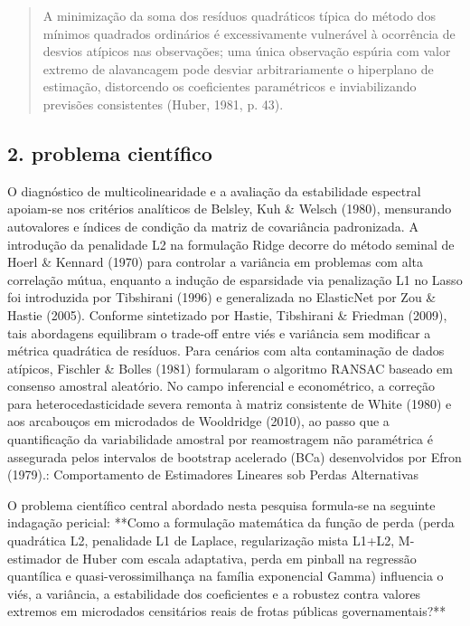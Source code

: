 \documentclass[12pt,a4paper]{article}
\begin{document}
\begin{quote}
\small A minimização da soma dos resíduos quadráticos típica do método dos mínimos quadrados ordinários é excessivamente vulnerável à ocorrência de desvios atípicos nas observações; uma única observação espúria com valor extremo de alavancagem pode desviar arbitrariamente o hiperplano de estimação, distorcendo os coeficientes paramétricos e inviabilizando previsões consistentes (Huber, 1981, p. 43).
\end{quote}


\subsection{2. problema científico}

O diagnóstico de multicolinearidade e a avaliação da estabilidade espectral apoiam-se nos critérios analíticos de Belsley, Kuh \& Welsch (1980), mensurando autovalores e índices de condição da matriz de covariância padronizada. A introdução da penalidade L2 na formulação Ridge decorre do método seminal de Hoerl \& Kennard (1970) para controlar a variância em problemas com alta correlação mútua, enquanto a indução de esparsidade via penalização L1 no Lasso foi introduzida por Tibshirani (1996) e generalizada no ElasticNet por Zou \& Hastie (2005). Conforme sintetizado por Hastie, Tibshirani \& Friedman (2009), tais abordagens equilibram o trade-off entre viés e variância sem modificar a métrica quadrática de resíduos. Para cenários com alta contaminação de dados atípicos, Fischler \& Bolles (1981) formularam o algoritmo RANSAC baseado em consenso amostral aleatório. No campo inferencial e econométrico, a correção para heterocedasticidade severa remonta à matriz consistente de White (1980) e aos arcabouços em microdados de Wooldridge (2010), ao passo que a quantificação da variabilidade amostral por reamostragem não paramétrica é assegurada pelos intervalos de bootstrap acelerado (BCa) desenvolvidos por Efron (1979).: Comportamento de Estimadores Lineares sob Perdas Alternativas

O problema científico central abordado nesta pesquisa formula-se na seguinte indagação pericial: **Como a formulação matemática da função de perda (perda quadrática L2, penalidade L1 de Laplace, regularização mista L1+L2, M-estimador de Huber com escala adaptativa, perda em pinball na regressão quantílica e quasi-verossimilhança na família exponencial Gamma) influencia o viés, a variância, a estabilidade dos coeficientes e a robustez contra valores extremos em microdados censitários reais de frotas públicas governamentais?**
\end{document}
